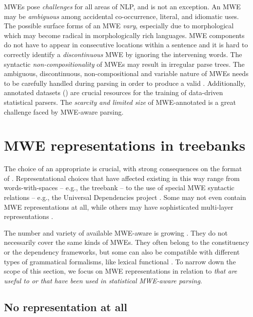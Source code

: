 \documentclass[output=paper]{langsci/langscibook}
\begin{document}
MWEs pose \textit{challenges} for all areas of NLP, and  is not an exception.
An MWE may be \textit{ambiguous} among accidental co-occurrence, literal, and idiomatic uses. The possible surface forms of an MWE \textit{vary}, especially due to morphological  which may become radical in morphologically rich languages. MWE components do not have to appear in consecutive locations within a sentence and it is hard to correctly identify a \textit{discontinuous} MWE by ignoring the intervening words. 
The syntactic \textit{non-compositionality} of MWEs may result in irregular parse trees.
The ambiguous, discontinuous, non-compositional and variable nature of MWEs needs to be carefully handled during parsing in order to produce a valid . 
Additionally, annotated datasets () are crucial resources for the training of data-driven statistical parsers. 
The \textit{scarcity and limited size} of MWE-annotated  is a great challenge faced by MWE-aware parsing. 


%
\section{MWE representations in treebanks} 
\label{con:sec:representation}


The choice of an appropriate  is crucial, with strong consequences on the format of . Representational choices that have affected existing  in this way range
from words-with-spaces -- e.g., the  treebank \citep{candito:2009} -- to the use of special MWE syntactic relations -- e.g., the Universal Dependencies project \citep{nivre16}. Some  may not even contain MWE representations at all, 
while others may have sophisticated multi-layer representations 
\citep{prague}. 


The number and variety of available MWE-aware  is growing \citep{rosen:2015}. 
They do not necessarily cover the same kinds of MWEs. 
They often belong to the constituency or the dependency frameworks, but
some can also be compatible with different types of grammatical formalisms, like lexical functional  \citep{dyvik16}. 
To narrow down the scope of this section, we focus on MWE representations in relation to  \emph{that are useful to or that have been used in statistical MWE-aware parsing}.

\subsection{No representation at all}
\label{con:ssec:norep}
\end{document}
